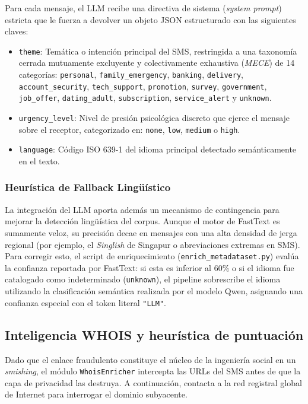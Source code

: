 Para cada mensaje, el LLM recibe una directiva de sistema (\textit{system prompt}) estricta que le fuerza a devolver un objeto JSON estructurado con las siguientes claves:
\begin{itemize}
    \item \texttt{theme}: Temática o intención principal del SMS, restringida a una taxonomía cerrada mutuamente excluyente y colectivamente exhaustiva (\textit{MECE}) de 14 categorías: \texttt{personal}, \texttt{family\_emergency}, \texttt{banking}, \texttt{delivery}, \texttt{account\_security}, \texttt{tech\_support}, \texttt{promotion}, \texttt{survey}, \texttt{government}, \texttt{job\_offer}, \texttt{dating\_adult}, \texttt{subscription}, \texttt{service\_alert} y \texttt{unknown}.
    \item \texttt{urgency\_level}: Nivel de presión psicológica discreto que ejerce el mensaje sobre el receptor, categorizado en: \texttt{none}, \texttt{low}, \texttt{medium} o \texttt{high}.
    \item \texttt{language}: Código ISO 639-1 del idioma principal detectado semánticamente en el texto.
\end{itemize}

\subsubsection{Heurística de Fallback Lingüístico}
La integración del LLM aporta además un mecanismo de contingencia para mejorar la detección lingüística del corpus. Aunque el motor de FastText es sumamente veloz, su precisión decae en mensajes con una alta densidad de jerga regional (por ejemplo, el \textit{Singlish} de Singapur o abreviaciones extremas en SMS). Para corregir esto, el script de enriquecimiento (\texttt{enrich\_metadataset.py}) evalúa la confianza reportada por FastText: si esta es inferior al $60\%$ o si el idioma fue catalogado como indeterminado (\texttt{unknown}), el pipeline sobrescribe el idioma utilizando la clasificación semántica realizada por el modelo Qwen, asignando una confianza especial con el token literal \texttt{"LLM"}.

\subsection{Inteligencia WHOIS y heurística de puntuación}
Dado que el enlace fraudulento constituye el núcleo de la ingeniería social en un \textit{smishing}, el módulo \texttt{WhoisEnricher} intercepta las URLs del SMS antes de que la capa de privacidad las destruya. A continuación, contacta a la red registral global de Internet para interrogar el dominio subyacente.

